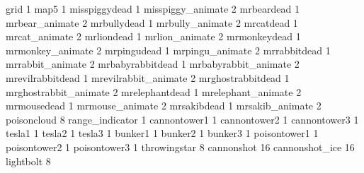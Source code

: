grid 1
map5 1
misspiggydead 1
misspiggy_animate 2
mrbeardead 1
mrbear_animate 2
mrbullydead 1
mrbully_animate 2
mrcatdead 1
mrcat_animate 2
mrliondead 1
mrlion_animate 2
mrmonkeydead 1
mrmonkey_animate 2
mrpingudead 1
mrpingu_animate 2
mrrabbitdead 1
mrrabbit_animate 2
mrbabyrabbitdead 1
mrbabyrabbit_animate 2
mrevilrabbitdead 1
mrevilrabbit_animate 2
mrghostrabbitdead 1
mrghostrabbit_animate 2
mrelephantdead 1
mrelephant_animate 2
mrmousedead 1
mrmouse_animate 2
mrsakibdead 1
mrsakib_animate 2
poisoncloud 8
range_indicator 1
cannontower1 1
cannontower2 1
cannontower3 1
tesla1 1
tesla2 1
tesla3 1
bunker1 1
bunker2 1
bunker3 1
poisontower1 1
poisontower2 1
poisontower3 1
throwingstar 8
cannonshot 16
cannonshot_ice 16
lightbolt 8
